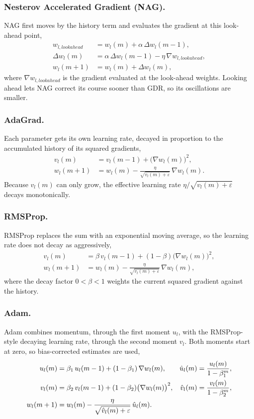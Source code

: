 \documentclass[runningheads]{llncs}
\begin{document}
\subsubsection{Nesterov Accelerated Gradient (NAG).}
NAG first moves by the history term and evaluates the gradient at this look-ahead point,
\begin{align}
w_{l,\mathit{lookahead}}&=w_l(m)+\alpha\,\Delta w_l(m-1),\\
\Delta w_l(m)&=\alpha\,\Delta w_l(m-1)-\eta\,\nabla w_{l,\mathit{lookahead}},\\
w_l(m+1)&=w_l(m)+\Delta w_l(m),
\end{align}
where $\nabla w_{l,\mathit{lookahead}}$ is the gradient evaluated at the look-ahead weights.
Looking ahead lets NAG correct its course sooner than GDR, so its oscillations are smaller.

\subsubsection{AdaGrad.}
Each parameter gets its own learning rate, decayed in proportion to the accumulated history of its
squared gradients,
\begin{align}
v_l(m)&=v_l(m-1)+\bigl(\nabla w_l(m)\bigr)^2,\\
w_l(m+1)&=w_l(m)-\frac{\eta}{\sqrt{v_l(m)+\varepsilon}}\,\nabla w_l(m).
\end{align}
Because $v_l(m)$ can only grow, the effective learning rate $\eta/\sqrt{v_l(m)+\varepsilon}$ decays
monotonically.

\subsubsection{RMSProp.}
RMSProp replaces the sum with an exponential moving average, so the learning rate does not decay as
aggressively,
\begin{align}
v_l(m)&=\beta\,v_l(m-1)+(1-\beta)\bigl(\nabla w_l(m)\bigr)^2,\\
w_l(m+1)&=w_l(m)-\frac{\eta}{\sqrt{v_l(m)+\varepsilon}}\,\nabla w_l(m),
\end{align}
where the decay factor $0<\beta<1$ weights the current squared gradient against the history.

\subsubsection{Adam.}
Adam combines momentum, through the first moment $u_l$, with the RMSProp-style decaying learning rate,
through the second moment $v_l$. Both moments start at zero, so bias-corrected estimates are used,
\begin{align}
u_l(m)&=\beta_1\,u_l(m-1)+(1-\beta_1)\,\nabla w_l(m), &
\hat{u}_l(m)&=\frac{u_l(m)}{1-\beta_1^{m}},\\
v_l(m)&=\beta_2\,v_l(m-1)+(1-\beta_2)\bigl(\nabla w_l(m)\bigr)^2, &
\hat{v}_l(m)&=\frac{v_l(m)}{1-\beta_2^{m}},\\
w_l(m+1)&=w_l(m)-\frac{\eta}{\sqrt{\hat{v}_l(m)+\varepsilon}}\,\hat{u}_l(m). \notag
\end{align}
\end{document}
